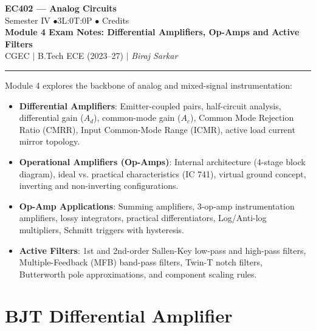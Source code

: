 \documentclass[12pt,a4paper]{article}
\begin{document}
\begin{center}
  {\LARGE\bfseries\color{myred} EC402 --- Analog Circuits}\\[5pt]
  {\normalsize\color{mydark} Semester IV \quad$\bullet$\quad 3L:0T:0P \quad$\bullet$ Credits}\\[3pt]
  {\normalsize\color{myteal}\textbf{Module 4 Exam Notes: Differential Amplifiers, Op-Amps and Active Filters}}\\[3pt]
  {\small\color{mydark} CGEC \;$|$\; B.Tech ECE (2023--27) \;$|$\; \textit{Biraj Sarkar}}
\end{center}
\vspace{-2pt}
\noindent\rule{\linewidth}{0.8pt}
\vspace{-2pt}

\begin{tcolorbox}[defbox, title={Module Scope \& Key Learning Objectives}]
Module 4 explores the backbone of analog and mixed-signal instrumentation:
\begin{itemize}[leftmargin=12pt, itemsep=2pt, topsep=1pt]
  \item \textbf{Differential Amplifiers}: Emitter-coupled pairs, half-circuit analysis, differential gain ($A_d$), common-mode gain ($A_c$), Common Mode Rejection Ratio ($\text{CMRR}$), Input Common-Mode Range ($\text{ICMR}$), active load current mirror topology.
  \item \textbf{Operational Amplifiers (Op-Amps)}: Internal architecture (4-stage block diagram), ideal vs. practical characteristics (IC 741), virtual ground concept, inverting and non-inverting configurations.
  \item \textbf{Op-Amp Applications}: Summing amplifiers, 3-op-amp instrumentation amplifiers, lossy integrators, practical differentiators, Log/Anti-log multipliers, Schmitt triggers with hysteresis.
  \item \textbf{Active Filters}: 1st and 2nd-order Sallen-Key low-pass and high-pass filters, Multiple-Feedback (MFB) band-pass filters, Twin-T notch filters, Butterworth pole approximations, and component scaling rules.
\end{itemize}
\end{tcolorbox}

\tableofcontents
\newpage

\section{BJT Differential Amplifier}
\end{document}

